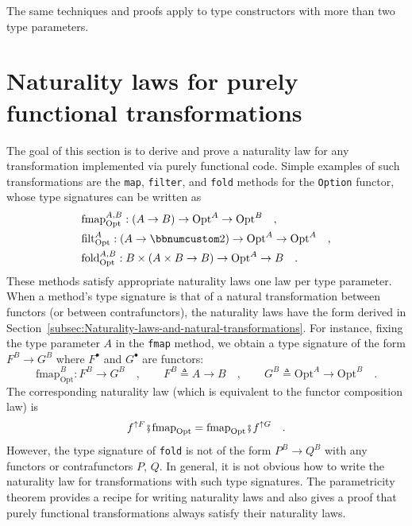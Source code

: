 The same techniques and proofs apply to type constructors with more
than two type parameters.

\section{Naturality laws for purely functional transformations\label{sec:Naturality-laws-for-fully-parametric-functions}}

The goal of this section is to derive and prove a naturality law for
any transformation implemented via purely functional code. Simple
examples of such transformations are the \lstinline!map!, \lstinline!filter!,
and \lstinline!fold! methods for the \lstinline!Option! functor,
whose type signatures can be written as
\begin{align*}
 & \text{fmap}_{\text{Opt}}^{A,B}:\left(A\rightarrow B\right)\rightarrow\text{Opt}^{A}\rightarrow\text{Opt}^{B}\quad,\\
 & \text{filt}_{\text{Opt}}^{A}:\left(A\rightarrow\bbnum 2\right)\rightarrow\text{Opt}^{A}\rightarrow\text{Opt}^{A}\quad,\\
 & \text{fold}_{\text{Opt}}^{A,B}:B\times\left(A\times B\rightarrow B\right)\rightarrow\text{Opt}^{A}\rightarrow B\quad.
\end{align*}
These methods satisfy appropriate naturality laws \textemdash{} one
law per type parameter. When a method's type signature is that of
a natural transformation between functors (or between contrafunctors),
the naturality laws have the form derived in Section~\ref{subsec:Naturality-laws-and-natural-transformations}.
For instance, fixing the type parameter $A$ in the \lstinline!fmap!
method, we obtain a type signature of the form $F^{B}\rightarrow G^{B}$
where $F^{\bullet}$ and $G^{\bullet}$ are functors:
\[
\text{fmap}_{\text{Opt}}^{B}:F^{B}\rightarrow G^{B}\quad,\quad\quad F^{B}\triangleq A\rightarrow B\quad,\quad\quad G^{B}\triangleq\text{Opt}^{A}\rightarrow\text{Opt}^{B}\quad.
\]
The corresponding naturality law (which is equivalent to the functor
composition law) is
\[
f^{\uparrow F}\bef\text{fmap}_{\text{Opt}}=\text{fmap}_{\text{Opt}}\bef f^{\uparrow G}\quad.
\]
However, the type signature of \lstinline!fold! is not of the form
$P^{B}\rightarrow Q^{B}$ with any functors or contrafunctors $P$,
$Q$. In general, it is not obvious how to write the naturality law
for transformations with such type signatures. The parametricity theorem
provides a recipe for writing naturality laws and also gives a proof
that purely functional transformations always satisfy their naturality
laws.


